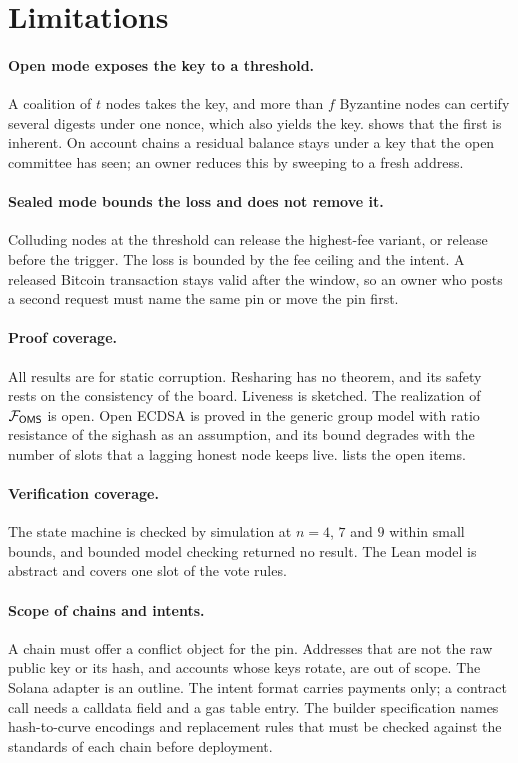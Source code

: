 \section{Limitations}\label{sec:limits}

\paragraph{Open mode exposes the key to a threshold.} A coalition of $t$ nodes takes the key, and more than $f$ Byzantine nodes can certify several digests under one nonce, which also yields the key.  shows that the first is inherent. On account chains a residual balance stays under a key that the open committee has seen; an owner reduces this by sweeping to a fresh address.

\paragraph{Sealed mode bounds the loss and does not remove it.} Colluding nodes at the threshold can release the highest-fee variant, or release before the trigger. The loss is bounded by the fee ceiling and the intent. A released Bitcoin transaction stays valid after the window, so an owner who posts a second request must name the same pin or move the pin first.

\paragraph{Proof coverage.} All results are for static corruption. Resharing has no theorem, and its safety rests on the consistency of the board. Liveness is sketched. The realization of $\mathcal{F}_{\mathsf{OMS}}$ is open. Open ECDSA is proved in the generic group model with ratio resistance of the sighash as an assumption, and its bound degrades with the number of slots that a lagging honest node keeps live.  lists the open items.

\paragraph{Verification coverage.} The state machine is checked by simulation at $n = 4$, $7$ and $9$ within small bounds, and bounded model checking returned no result. The Lean model is abstract and covers one slot of the vote rules.

\paragraph{Scope of chains and intents.} A chain must offer a conflict object for the pin. Addresses that are not the raw public key or its hash, and accounts whose keys rotate, are out of scope. The Solana adapter is an outline. The intent format carries payments only; a contract call needs a calldata field and a gas table entry. The builder specification names hash-to-curve encodings and replacement rules that must be checked against the standards of each chain before deployment.

